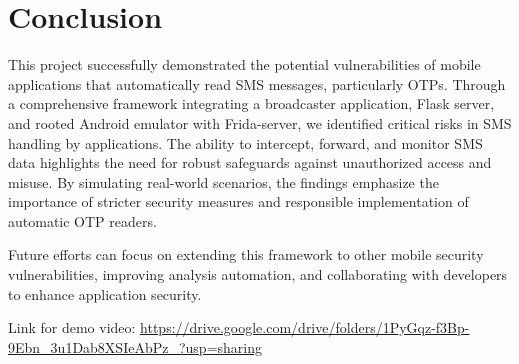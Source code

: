 \documentclass[a4paper,12pt]{article}
\begin{document}
\section{Conclusion}  
This project successfully demonstrated the potential vulnerabilities of mobile applications that automatically read SMS messages, particularly OTPs. Through a comprehensive framework integrating a broadcaster application, Flask server, and rooted Android emulator with Frida-server, we identified critical risks in SMS handling by applications. The ability to intercept, forward, and monitor SMS data highlights the need for robust safeguards against unauthorized access and misuse. By simulating real-world scenarios, the findings emphasize the importance of stricter security measures and responsible implementation of automatic OTP readers.  

Future efforts can focus on extending this framework to other mobile security vulnerabilities, improving analysis automation, and collaborating with developers to enhance application security.  

Link for demo video: \url{https://drive.google.com/drive/folders/1PyGqz-f3Bp-9Ebn_3u1Dab8XSIeAbPz_?usp=sharing}
\end{document}
